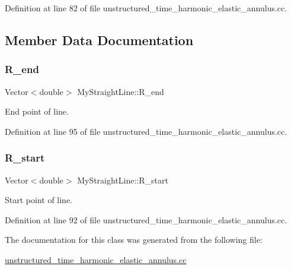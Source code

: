 Definition at line 82 of file unstructured\+\_\+time\+\_\+harmonic\+\_\+elastic\+\_\+annulus.\+cc.



\subsection{Member Data Documentation}
\mbox{\label{classMyStraightLine_afa466e12301ccea99a02fe1bde615691}} 
\subsubsection{\texorpdfstring{R\+\_\+end}{R\_end}}
{\footnotesize\ttfamily Vector$<$double$>$ My\+Straight\+Line\+::\+R\+\_\+end\hspace{0.3cm}{\ttfamily [private]}}



End point of line. 



Definition at line 95 of file unstructured\+\_\+time\+\_\+harmonic\+\_\+elastic\+\_\+annulus.\+cc.

\mbox{\label{classMyStraightLine_a0f66636dd5d1e7ff6ec93acf90879f0c}} 
\subsubsection{\texorpdfstring{R\+\_\+start}{R\_start}}
{\footnotesize\ttfamily Vector$<$double$>$ My\+Straight\+Line\+::\+R\+\_\+start\hspace{0.3cm}{\ttfamily [private]}}



Start point of line. 



Definition at line 92 of file unstructured\+\_\+time\+\_\+harmonic\+\_\+elastic\+\_\+annulus.\+cc.



The documentation for this class was generated from the following file\+:\begin{DoxyCompactItemize}
\item 
\hyperlink{unstructured__time__harmonic__elastic__annulus_8cc}{unstructured\+\_\+time\+\_\+harmonic\+\_\+elastic\+\_\+annulus.\+cc}\end{DoxyCompactItemize}
